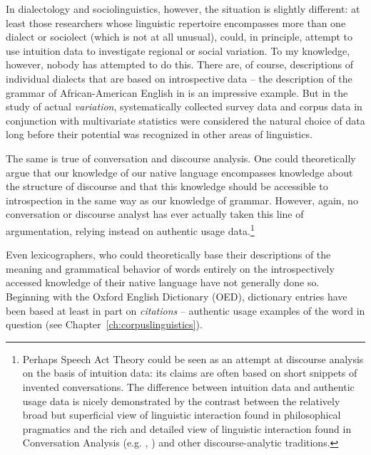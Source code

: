 In dialectology and sociolinguistics,  however, the situation is slightly different: at least those researchers whose linguistic repertoire encompasses more than one dialect or sociolect (which is not at all unusual), could, in principle, attempt to use intuition  data to investigate regional or social variation.  To my knowledge, however, nobody has attempted to do this. There are, of course, descriptions  of individual dialects that are based on introspective  data -- the description of the grammar  of African\hyp{}American English in \citet{green_african_2002} is an impressive example. But in the study of actual \emph{variation}, systematically collected survey data \citep[e.g.][]{labov_atlas_2006} and corpus data in conjunction with multivariate  statistics  \citep[e.g.][]{tagliamonte_analysing_2006} were considered the natural choice of data long before their potential was recognized in other areas of linguistics.

The same is true of conversation and discourse analysis. One could theoretically argue that our knowledge of our native language encompasses knowledge about the structure of discourse and that this knowledge should be accessible to introspection  in the same way as our knowledge of grammar.  However, again, no conversation or discourse analyst has ever actually taken this line of argumentation, relying instead on authentic  usage data.\footnote{Perhaps Speech Act Theory could be seen as an attempt at discourse analysis on the basis of intuition  data: its claims are often based on short snippets of invented conversations.  The difference between intuition data and authentic  usage data is nicely demonstrated by the contrast between the relatively broad but superficial view of linguistic interaction found in philosophical pragmatics  and the rich and detailed view of linguistic interaction found in Conversation Analysis (e.g. \citealt{sacks_simplest_1974}, \citealt{sacks_lectures_1992}) and other discourse\hyp{}analytic traditions.}

Even lexicographers, who could theoretically base their descriptions  of the meaning  and grammatical behavior of words entirely on the introspectively  accessed knowledge of their native language have not generally done so. Beginning with the Oxford English Dictionary (OED),  dictionary  entries have been based at least in part on \textit{citations} -- authentic  usage examples of the word in question (see Chapter~\ref{ch:corpuslinguistics}).

